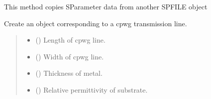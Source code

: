 \documentclass[letterpaper,10pt,english]{sphinxmanual}
\begin{document}
\begin{fulllineitems}

\begin{fulllineitems}
\label{\detokenize{touchstone:touchstone.spfile.copy_data_from_spfile}}
\pysigstartsignatures
{}
\pysigstopsignatures
\sphinxAtStartPar
This method copies S\sphinxhyphen{}Parameter data from another SPFILE object

\end{fulllineitems}


\begin{fulllineitems}
\label{\detokenize{touchstone:touchstone.spfile.cpwgline}}
\pysigstartsignatures
{}
\pysigstopsignatures
\sphinxAtStartPar
Create an  object corresponding to a cpwg transmission line.
\begin{quote}\begin{description}
\begin{itemize}
\item {} 
\sphinxAtStartPar
{} () \textendash{} Length of cpwg line.

\item {} 
\sphinxAtStartPar
{} () \textendash{} Width of cpwg line.

\item {} 
\sphinxAtStartPar
{} () \textendash{} Thickness of metal.

\item {} 
\sphinxAtStartPar
{} () \textendash{} Relative permittivity of substrate.


\end{itemize}
\end{description}
\end{quote}
\end{fulllineitems}
\end{fulllineitems}
\end{document}
